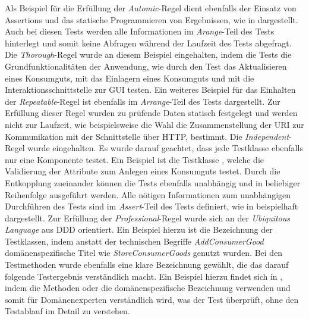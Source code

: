 Als Beispiel für die Erfüllung der \textit{Automic}-Regel dient ebenfalls der Einsatz von Assertions und das statische Programmieren von Ergebnissen, wie in \href{}{} dargestellt.
Auch bei diesen Tests werden alle Informationen im \textit{Arange}-Teil des Tests hinterlegt und somit keine Abfragen während der Laufzeit des Tests abgefragt.
Die \textit{Thorough}-Regel wurde an diesem Beispiel eingehalten, indem die Tests die Grundfunktionalitäten der Anwendung, wie durch den Test \href{}{} das Aktualisieren eines Konsumguts, mit \href{}{} das Einlagern eines Konsumguts und mit \href{}{} die Interaktionsschnittstelle zur \ac{GUI} testen.
Ein weiteres Beispiel für das Einhalten der \textit{Repeatable}-Regel ist ebenfalls im \textit{Arrange}-Teil des Tests \href{}{} dargestellt.
Zur Erfüllung dieser Regel wurden zu prüfende Daten statisch festgelegt und werden nicht zur Laufzeit, wie beispielsweise die Wahl die Zusammenstellung der \ac{URI} zur Kommunikation mit der Schnittstelle über \ac{HTTP}, bestimmt.
Die \textit{Independent}-Regel wurde eingehalten.
Es wurde darauf geachtet, dass jede Testklasse ebenfalls nur eine Komponente testet.
Ein Beispiel ist die Testklasse \href{}{}, welche die Validierung der Attribute zum Anlegen eines Konsumguts testet.
Durch die Entkopplung zueinander können die Tests ebenfalls unabhängig und in beliebiger Reihenfolge ausgeführt werden.
Alle nötigen Informationen zum unabhängigen Durchführen des Tests sind im \textit{Assert}-Teil des Tests definiert, wie in \href{}{} beispielhaft dargestellt.
Zur Erfüllung der \textit{Professional}-Regel wurde sich an der \textit{Ubiquitous Language} aus \ac{DDD} orientiert. Ein Beispiel hierzu ist die Bezeichnung der Testklassen, indem anstatt der technischen Begriffe \textit{AddConsumerGood} domänenspezifische Titel wie \textit{StoreConsumerGoods} genutzt wurden.
Bei den Testmethoden wurde ebenfalls eine klare Bezeichnung gewählt, die das darauf folgende Testergebnis verständlich macht.
Ein Beispiel hierzu findet sich in \href{}{}, indem die Methoden \href{}{} oder \href{}{} die domänenspezifische Bezeichnung verwenden und somit für Domänenexperten verständlich wird, was der Test überprüft, ohne den Testablauf im Detail zu verstehen.

